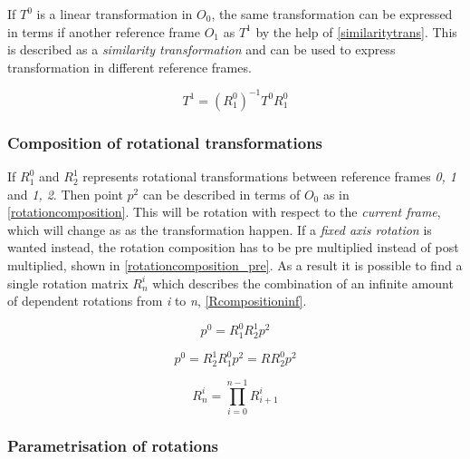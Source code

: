 If $T^0$ is a linear transformation in $O_0$, the same transformation can be expressed in terms if another reference frame $O_1$ as $T^1$ by the help of \eqref{similaritytrans}. This is described as a \textit{similarity transformation} and can be used to express transformation in different reference frames.

\begin{equation}\label{similaritytrans}
T^1 = (R^0_1)^{-1}T^0 R^0_1
\end{equation}

\subsubsection{Composition of rotational transformations}

If $R^0_1$ and $R^1_2$ represents rotational transformations between reference frames \textit{0, 1} and \textit{1, 2}. Then point $p^2$ can be described in terms of $O_0$ as in \eqref{rotationcomposition}. This will be rotation with respect to the \textit{current frame}, which will change as as the transformation happen. If a \textit{fixed axis rotation} is wanted instead, the rotation composition has to be pre multiplied instead of post multiplied, shown in \eqref{rotationcomposition_pre}. As a result it is possible to find a single rotation matrix \textit{$R^i_n$} which describes the combination of an infinite amount of dependent rotations from \textit{i} to \textit{n}, \eqref{Rcompositioninf}.


\begin{equation}\label{rotationcomposition}
p^0 = R^0_1 R^1_2 p^2
\end{equation}

\begin{equation}\label{rotationcomposition_pre}
p^0 = R^1_2 R^0_1 p^2 = R R^0_2 p^2
\end{equation}

\begin{equation}\label{Rcompositioninf}
R^i_n = \prod_{i=0}^{n-1} R^i_{i+1}
\end{equation}


\subsubsection{Parametrisation of rotations}

